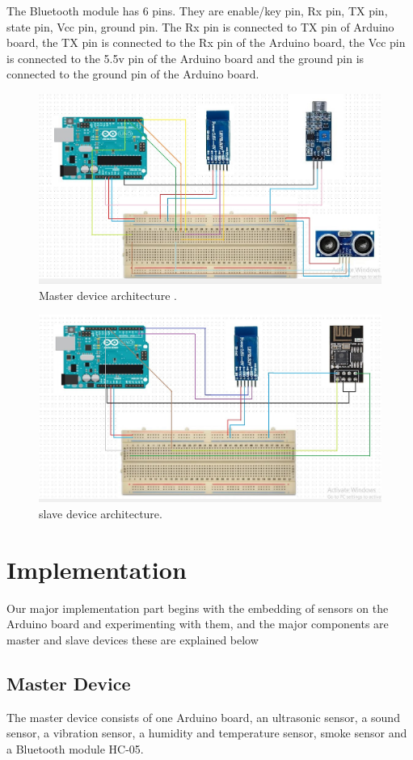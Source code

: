 The Bluetooth module has 6 pins. They are enable/key pin, Rx pin, TX pin, state pin, Vcc pin, ground pin. The Rx pin is connected to TX pin of Arduino board, the TX pin is connected to the Rx pin of the Arduino board, the Vcc pin is connected to the 5.5v pin of the Arduino board and the ground pin is connected to the ground pin of the Arduino board.
\begin{figure}[h]
\centerline{\includegraphics[width=5.7in]{master}}
\caption{Master device architecture .}
\end{figure}
\begin{figure}[h]
\centerline{\includegraphics[width=5.7in]{slave}}
\caption{slave device architecture.}
\end{figure}
\section{Implementation}
Our major implementation part begins with the embedding of sensors on the Arduino board and experimenting with them, and the major components are master and slave devices these are explained below
\subsection{Master Device}
The master device consists of one Arduino board, an ultrasonic sensor, a sound sensor, a vibration sensor, a humidity and temperature sensor, smoke sensor and a Bluetooth module HC-05.

